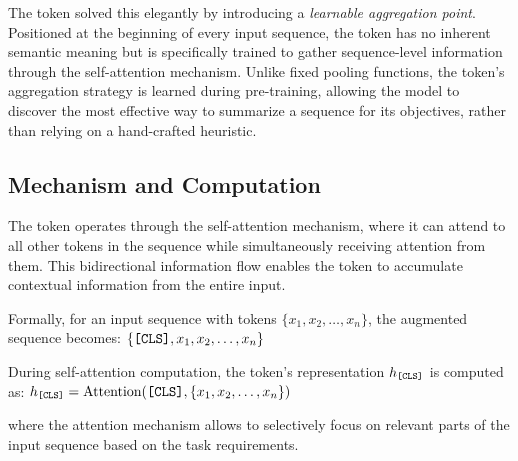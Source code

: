 The \cls{} token solved this elegantly by introducing a \emph{learnable aggregation point}. Positioned at the beginning of every input sequence, the \cls{} token has no inherent semantic meaning but is specifically trained to gather sequence-level information through the self-attention mechanism. Unlike fixed pooling functions, the \cls{} token's aggregation strategy is learned during pre-training, allowing the model to discover the most effective way to summarize a sequence for its objectives, rather than relying on a hand-crafted heuristic.
\begin{comment}
Feedback: This is a great explanation. To add even more intuition, you could add a sentence explaining *why* a learnable aggregator is better. For example: "Unlike fixed pooling functions, the [CLS] token's aggregation strategy is learned during pre-training, allowing the model to discover the most effective way to summarize a sequence for its objectives, rather than relying on a hand-crafted heuristic."

STATUS: addressed - added explanation about learnable vs fixed pooling advantages
\end{comment}

\subsection{Mechanism and Computation}

The \cls{} token operates through the self-attention mechanism, where it can attend to all other tokens in the sequence while simultaneously receiving attention from them. This bidirectional information flow enables the \cls{} token to accumulate contextual information from the entire input.

Formally, for an input sequence with tokens $\{x_1, x_2, \ldots, x_n\}$, the augmented sequence becomes:
$\{\texttt{[CLS]}{}, x_1, x_2, \ldots, x_n\}$

During self-attention computation, the \cls{} token's representation $h_{\texttt{[CLS]}{}}$ is computed as:
$h_{\texttt{[CLS]}{}} = \text{Attention}(\texttt{[CLS]}{}, \{x_1, x_2, \ldots, x_n\})$

where the attention mechanism allows \cls{} to selectively focus on relevant parts of the input sequence based on the task requirements.

